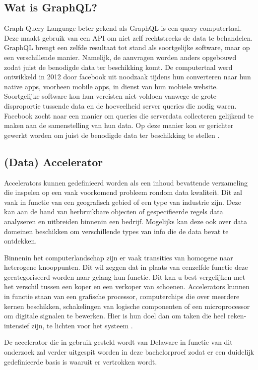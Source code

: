 \subsection{Wat is GraphQL?}
Graph Query Language beter gekend als GraphQL is een query computertaal. Deze maakt gebruik van een API om niet zelf rechtstreeks de data te behandelen. GraphQL brengt een zelfde resultaat tot stand als soortgelijke software, maar op een verschillende manier. Namelijk, de aanvragen worden anders opgebouwd zodat juist de benodigde data ter beschikking komt. De computertaal werd ontwikkeld in 2012 door facebook uit noodzaak tijdens hun converteren naar hun native apps, voorheen mobile apps,
in dienst van hun mobiele website. Soortgelijke software kon hun vereisten niet voldoen vanwege de grote disproportie tussende data en de hoeveelheid server queries die nodig waren. Facebook zocht naar een manier om queries die serverdata collecteren gelijkend te maken aan de samenstelling van hun data. Op deze manier kon er gerichter gewerkt worden om juist de benodigde data ter beschikking te stellen \autocite{Brysbaert2021}.

\subsection{(Data) Accelerator}
Accelerators kunnen gedefinieerd worden als een inhoud bevattende verzameling die inspelen op een vaak voorkomend probleem rondom data kwaliteit. Dit zal vaak in functie van een geografisch gebied of een type van industrie zijn. Deze kan aan de hand van herbruikbare objecten of gespecifieerde regels data analyseren en uitbreiden binnenin een bedrijf. Mogelijks kan deze ook over data domeinen beschikken om verschillende types van info die de data bevat te ontdekken\newline\autocite{Informatica2021}.

Binnenin het computerlandschap zijn er vaak transities van homogene naar heterogene knooppunten. Dit wil zeggen dat in plaats van eenzelfde functie deze gecategoriseerd worden naar gelang hun functie. Dit kan u best vergelijken met het verschil tussen een koper en een verkoper van schoenen. Accelerators kunnen in functie staan van een grafische processor, computerchips die over meerdere kernen beschikken, schakelingen van logische componenten of een microprocessor om digitale signalen te bewerken. Hier is hun doel dan om taken die heel reken-intensief zijn, te lichten voor het systeem \autocite{LopezNovoa2015}.

De accelerator die in gebruik gesteld wordt van Delaware in functie van dit onderzoek zal verder uitgespit worden in deze bachelorproef zodat er een duidelijk gedefinieerde basis is waaruit er vertrokken wordt.

